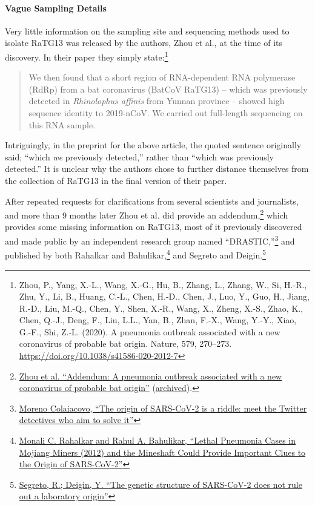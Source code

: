 \documentclass[11pt]{article}
\begin{document}
\paragraph{Vague Sampling Details}
\label{sec:orgc0b7fb9}
Very little information on the sampling site and sequencing methods used to isolate RaTG13 was released by the authors, Zhou et al., at the time of its discovery. In their paper they simply state:\footnote{Zhou, P., Yang, X.-L., Wang, X.-G., Hu, B., Zhang, L., Zhang, W., Si, H.-R., Zhu, Y., Li, B., Huang, C.-L., Chen, H.-D., Chen, J., Luo, Y., Guo, H., Jiang, R.-D., Liu, M.-Q., Chen, Y., Shen, X.-R., Wang, X., Zheng, X.-S., Zhao, K., Chen, Q.-J., Deng, F., Liu, L.L., Yan, B., Zhan, F.-X., Wang, Y.-Y., Xiao, G.-F., Shi, Z.-L. (2020). A pneumonia outbreak associated with a new coronavirus of probable bat origin. Nature, 579, 270–273. \url{https://doi.org/10.1038/s41586-020-2012-7}}
\begin{quote}
We then found that a short region of RNA-dependent RNA polymerase (RdRp) from a bat coronavirus (BatCoV RaTG13) -- which was previously detected in \emph{Rhinolophus affinis} from Yunnan province -- showed high sequence identity to 2019-nCoV. We carried out full-length sequencing on this RNA sample.
\end{quote}
Intriguingly, in the preprint for the above article, the quoted sentence originally said; ``which \emph{we} previously detected,'' rather than ``which was previously detected.'' It is unclear why the authors chose to further distance themselves from the collection of RaTG13 in the final version of their paper.

After repeated requests for clarifications from several scientists and journalists, and more than 9 months later Zhou et al. did provide an addendum,\footnote{\href{https://www.nature.com/articles/s41586-020-2951-z}{Zhou et al. ``Addendum: A pneumonia outbreak associated with a new coronavirus of probable bat origin''} (\href{https://archive.ph/jGIfV}{archived}).} which provides some missing information on RaTG13, most of it previously discovered and made public by an independent research group named ``DRASTIC,''\footnote{\href{https://mygenomix.medium.com/the-origin-of-sars-cov-2-is-a-riddle-meet-the-twitter-detectives-who-aim-to-solve-it-5050216fd279}{Moreno Colaiacovo, ``The origin of SARS-CoV-2 is a riddle: meet the Twitter detectives who aim to solve it''}} and published by both Rahalkar and Bahulikar,\footnote{\href{https://www.frontiersin.org/articles/10.3389/fpubh.2020.581569/full}{Monali C. Rahalkar and Rahul A. Bahulikar, ``Lethal Pneumonia Cases in Mojiang Miners (2012) and the Mineshaft Could Provide Important Clues to the Origin of SARS-CoV-2''}} and Segreto and Deigin.\footnote{\href{https://onlinelibrary.wiley.com/doi/10.1002/bies.202000240}{Segreto, R.; Deigin, Y. ``The genetic structure of SARS-CoV-2 does not rule out a laboratory origin''}}
\end{document}
